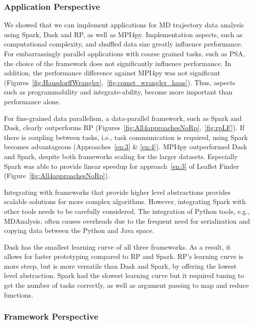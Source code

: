 \subsubsection*{Application Perspective}

We showed that we can implement applications for MD trajectory data analysis
using Spark, Dask and RP, as well as MPI4py. Implementation aspects,
such as computational complexity, and shuffled data size greatly influence
performance. For embarrassingly parallel applications with coarse grained tasks,
such as PSA, the choice of the framework does not significantly influence
performance. In addition, the performance difference against MPI4py was not
significant
(Figures~\ref{fig:HausdorffWrangler},~\ref{fig:comet_wrangler_haus}). Thus,
aspects such as programmability and integrate-ability, become more important
than performance alone.

For fine-grained data parallelism, a data-parallel framework, such as Spark and
Dask, clearly outperforms RP
(Figures~\ref{fig:All4approachesNoRp},~\ref{fig:rpLF}). If there is coupling
between tasks, i.e., task communication is required, using Spark becomes
advantageous (Approaches~\ref{en:3} \& \ref{en:4}). MPI4py outperformed
Dask and Spark, despite both frameworks scaling for the larger datasets.
Especially Spark was able to provide linear speedup for approach~\ref{en:3} of
Leaflet Finder (Figure~\ref{fig:All4approachesNoRp}).

Integrating with frameworks that provide higher level abstractions provides
scalable solutions for more complex algorithms. However, integrating Spark with
other tools needs to be carefully considered. The integration of Python tools,
e.g., MDAnalysis, often causes overheads due to the frequent need for
serialization and copying data between the Python and Java space.

Dask has the smallest learning curve of all three frameworks. As a result, it
allows for faster prototyping compared to RP and Spark.
RP's learning curve is more steep, but is more versatile than Dask
and Spark, by offering the lowest level abstraction. Spark had the slowest
learning curve but it required tuning to get the number of tasks correctly, as
well as argument passing to map and reduce functions.

\subsubsection*{Framework Perspective}

